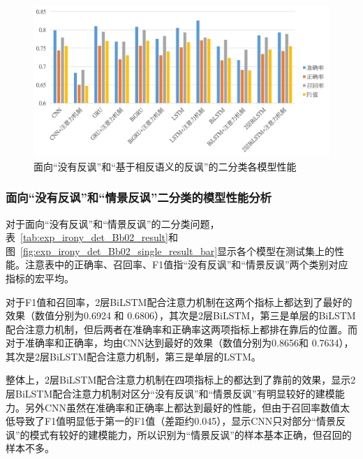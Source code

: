 \begin{figure}[H]
  \centering
  \includegraphics[width=\textwidth]{img/exp_irony_det_Bb01_single_result_bar.png}
  \caption{面向“没有反讽”和“基于相反语义的反讽”的二分类各模型性能}
  \label{fig:exp_irony_det_Bb01_single_result_bar}
\end{figure}

\subsubsection{面向“没有反讽”和“情景反讽”二分类的模型性能分析}
\label{sssec:exp_irony_det_Bb02_base}

对于面向“没有反讽”和“情景反讽”的二分类问题，表~\ref{tab:exp_irony_det_Bb02_result}和图~\ref{fig:exp_irony_det_Bb02_single_result_bar}显示各个模型在测试集上的性能。注意表中的正确率、召回率、F1值指“没有反讽”和“情景反讽”两个类别对应指标的宏平均。

对于F1值和召回率，2层BiLSTM配合注意力机制在这两个指标上都达到了最好的效果（数值分别为0.6924 和 0.6806），其次是2层BiLSTM，第三是单层的BiLSTM配合注意力机制，但后两者在准确率和正确率这两项指标上都排在靠后的位置。而对于准确率和正确率，均由CNN达到最好的效果（数值分别为0.8656和 0.7634），其次是2层BiLSTM配合注意力机制，第三是单层的LSTM。

整体上，2层BiLSTM配合注意力机制在四项指标上的都达到了靠前的效果，显示2层BiLSTM配合注意力机制对区分“没有反讽”和“情景反讽”有明显较好的建模能力。另外CNN虽然在准确率和正确率上都达到最好的性能，但由于召回率数值太低导致了F1值明显低于第一的F1值（差距约0.045），显示CNN只对部分“情景反讽”的模式有较好的建模能力，所以识别为“情景反讽”的样本基本正确，但召回的样本不多。

